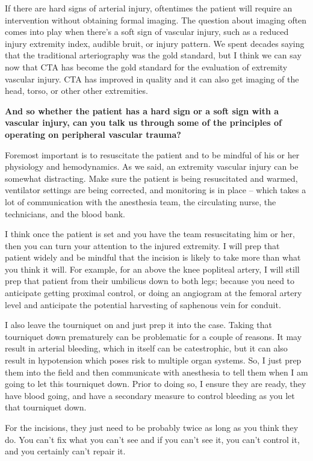 \documentclass[
]{book}
\begin{document}
If there are hard signs of arterial injury, oftentimes the patient will
require an intervention without obtaining formal imaging. The question
about imaging often comes into play when there's a soft sign of vascular
injury, such as a reduced injury extremity index, audible bruit, or
injury pattern. We spent decades saying that the traditional
arteriography was the gold standard, but I think we can say now that CTA
has become the gold standard for the evaluation of extremity vascular
injury. CTA has improved in quality and it can also get imaging of the
head, torso, or other other extremities.

\textbf{And so whether the patient has a hard sign or a soft sign with a
vascular injury, can you talk us through some of the principles of
operating on peripheral vascular trauma?}

Foremost important is to resuscitate the patient and to be mindful of
his or her physiology and hemodynamics. As we said, an extremity
vascular injury can be somewhat distracting. Make sure the patient is
being resuscitated and warmed, ventilator settings are being corrected,
and monitoring is in place -- which takes a lot of communication with
the anesthesia team, the circulating nurse, the technicians, and the
blood bank.

I think once the patient is set and you have the team resuscitating him
or her, then you can turn your attention to the injured extremity. I
will prep that patient widely and be mindful that the incision is likely
to take more than what you think it will. For example, for an above the
knee popliteal artery, I will still prep that patient from their
umbilicus down to both legs; because you need to anticipate getting
proximal control, or doing an angiogram at the femoral artery level and
anticipate the potential harvesting of saphenous vein for conduit.

I also leave the tourniquet on and just prep it into the case. Taking
that tourniquet down prematurely can be problematic for a couple of
reasons. It may result in arterial bleeding, which in itself can be
catestrophic, but it can also result in hypotension which poses risk to
multiple organ systems. So, I just prep them into the field and then
communicate with anesthesia to tell them when I am going to let this
tourniquet down. Prior to doing so, I ensure they are ready, they have
blood going, and have a secondary measure to control bleeding as you let
that tourniquet down.

For the incisions, they just need to be probably twice as long as you
think they do. You can't fix what you can't see and if you can't see it,
you can't control it, and you certainly can't repair it.
\end{document}
